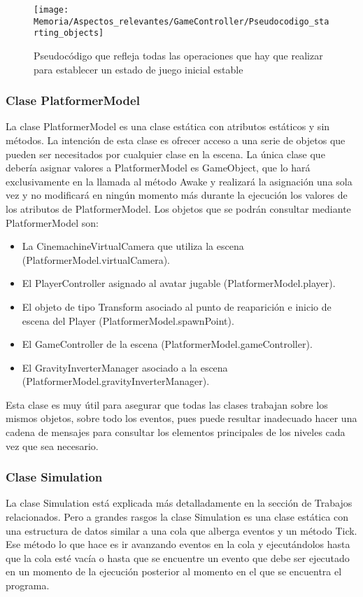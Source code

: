 \begin{figure}[h]
\centering
\texttt{[image: Memoria/Aspectos\_relevantes/GameController/Pseudocodigo\_starting\_objects]}
\caption{Pseudocódigo que refleja todas las operaciones que hay que realizar para establecer un estado de juego inicial estable}
\end{figure}

\subsubsection{Clase PlatformerModel}
La clase PlatformerModel es una clase estática con atributos estáticos y sin métodos. La intención de esta clase es ofrecer acceso a una serie de objetos que pueden ser necesitados por cualquier clase en la escena. La única clase que debería asignar valores a PlatformerModel es GameObject, que lo hará exclusivamente en la llamada al método Awake y realizará la asignación una sola vez y no modificará en ningún momento más durante la ejecución los valores de los atributos de PlatformerModel. Los objetos que se podrán consultar mediante PlatformerModel son:
\begin{itemize}
\item
La CinemachineVirtualCamera que utiliza la escena (PlatformerModel.virtualCamera).
\item
El PlayerController asignado al avatar jugable (PlatformerModel.player).
\item
El objeto de tipo Transform asociado al punto de reaparición e inicio de escena del Player (PlatformerModel.spawnPoint).
\item
El GameController de la escena (PlatformerModel.gameController).
\item
El GravityInverterManager asociado a la escena \\ (PlatformerModel.gravityInverterManager).
\end{itemize}
Esta clase es muy útil para asegurar que todas las clases trabajan sobre los mismos objetos, sobre todo los eventos, pues puede resultar inadecuado hacer una cadena de mensajes para consultar los elementos principales de los niveles cada vez que sea necesario.

\subsubsection{Clase Simulation}
La clase Simulation está explicada más detalladamente en la sección de Trabajos relacionados. Pero a grandes rasgos la clase Simulation es una clase estática con una estructura de datos similar a una cola que alberga eventos y un método Tick. Ese método lo que hace es ir avanzando eventos en la cola y ejecutándolos hasta que la cola esté vacía o hasta que se encuentre un evento que debe ser ejecutado en un momento de la ejecución posterior al momento en el que se encuentra el programa.

